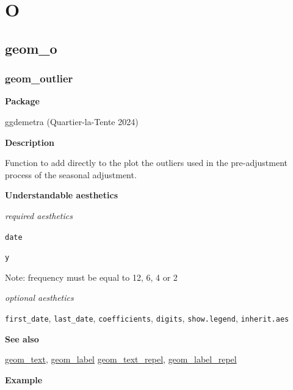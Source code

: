 \documentclass[
  letterpaper,
  DIV=11,
  numbers=noendperiod]{scrreprt}
\begin{document}
\part{O}

\chapter{geom\_o}\label{sec-o}

\section{geom\_outlier}\label{outlier}

\textbf{Package}

ggdemetra (Quartier-la-Tente 2024)

\textbf{Description}

Function to add directly to the plot the outliers used in the
pre-adjustment process of the seasonal adjustment.

\textbf{Understandable aesthetics}

\emph{required aesthetics}

\texttt{date}

\texttt{y}

Note: frequency must be equal to 12, 6, 4 or 2

\emph{optional aesthetics}

\texttt{first\_date}, \texttt{last\_date}, \texttt{coefficients},
\texttt{digits}, \texttt{show.legend}, \texttt{inherit.aes}

\textbf{See also}

\hyperref[text]{geom\_text}, \hyperref[label]{geom\_label}
\hyperref[text_repel]{geom\_text\_repel},
\hyperref[label_repel]{geom\_label\_repel}

\textbf{Example}
\end{document}
